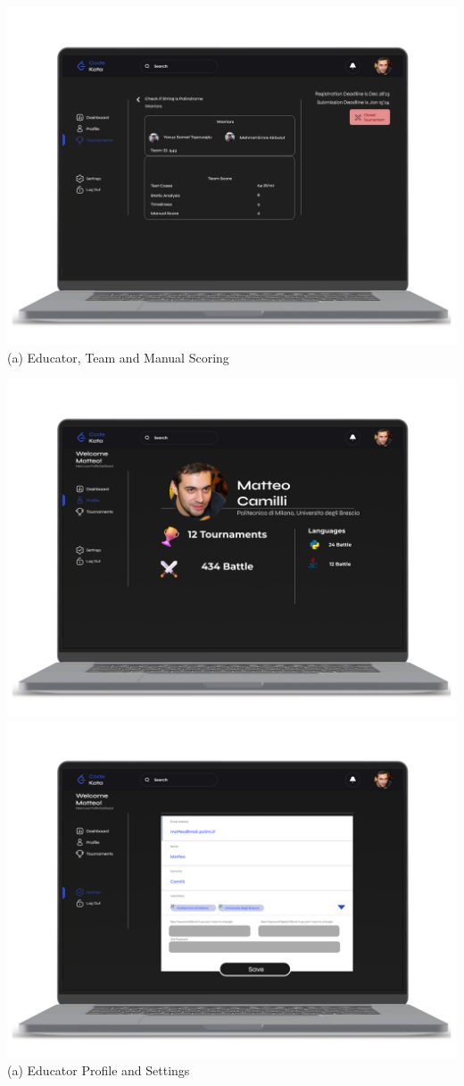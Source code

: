 \begin{center}
\includegraphics[scale=0.13]{Images/ui-ux/educator_team/educator_team_4.png}
        (a) Educator, Team and Manual Scoring
\end{center}
\begin{center}
\includegraphics[scale=0.13]{Images/ui-ux/educator_profile_settings/educator_profile.png}
\includegraphics[scale=0.13]{Images/ui-ux/educator_profile_settings/educator_settings.png}
        (a) Educator Profile and Settings
\end{center}
\newpage
    
